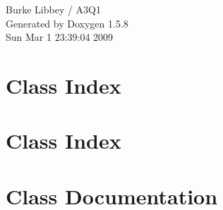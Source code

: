 \documentclass[a4paper]{book}
\begin{document}
\begin{titlepage}
\vspace*{7cm}
\begin{center}
{\Large Burke Libbey / A3Q1 }\\
\vspace*{1cm}
{\large Generated by Doxygen 1.5.8}\\
\vspace*{0.5cm}
{\small Sun Mar 1 23:39:04 2009}\\
\end{center}
\end{titlepage}
\clearemptydoublepage
{}
\tableofcontents
\clearemptydoublepage
{}
\chapter{Class Index}

\chapter{Class Index}

\chapter{Class Documentation}




















\printindex
\end{document}
